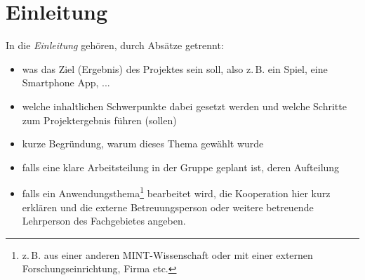 \chapter{Einleitung}

In die \emph{Einleitung} gehören, durch Absätze getrennt:

\begin{itemize}
\item was das Ziel (Ergebnis) des Projektes sein soll, also z.\,B. ein Spiel, eine Smartphone App, ... 
\item welche inhaltlichen Schwerpunkte dabei gesetzt werden und welche Schritte zum Projektergebnis führen (sollen)
\item kurze Begründung, warum dieses Thema gewählt wurde
\item falls eine klare Arbeitsteilung in der Gruppe geplant ist, deren Aufteilung
\item falls ein Anwendungsthema\footnote{z.\,B. aus einer anderen MINT-Wissenschaft oder mit einer externen Forschungseinrichtung, Firma etc.} bearbeitet wird, die Kooperation hier kurz erklären und die externe Betreuungsperson oder weitere betreuende Lehrperson des Fachgebietes angeben.
\end{itemize}